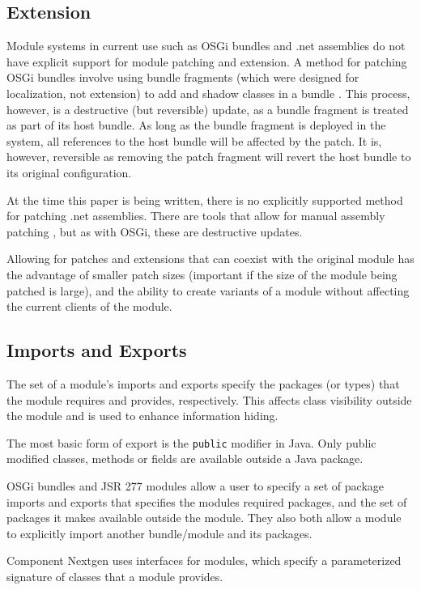 \subsection{Extension}

Module systems in current use such as OSGi bundles and .net assemblies do not 
have explicit support for module patching and extension. A method for patching OSGi bundles
involve using bundle fragments (which were designed for localization, not extension)
to add and shadow classes in a bundle \cite{patchingosgi}. This process, however, is
a destructive (but reversible) update, as a bundle fragment is treated as part of its 
host bundle. As long as the bundle fragment is deployed in the system, all references 
to the host bundle will be affected by the patch. It is, however, reversible as 
removing the patch fragment will revert the host bundle to its original configuration.

At the time this paper is being written, there is no explicitly supported method for
patching .net assemblies. There are tools that allow for manual assembly patching 
\cite{reflexil, monocecil}, but as with OSGi, these are destructive updates.

Allowing for patches and extensions that can coexist with the original module has the
advantage of smaller patch sizes (important if the size of the module being patched is
large), and the ability to create variants of a module without affecting the current
clients of the module.

\subsection{Imports and Exports}

The set of a module's imports and exports specify the packages (or types) that
the module requires and provides, respectively. This affects class
visibility outside the module and is used to enhance information hiding. 

The most basic form of export is the {\tt public} modifier in Java. Only
public modified classes, methods or fields are available outside a Java package.

OSGi bundles and JSR 277 modules allow a user to specify a set of package imports 
and exports that specifies the modules required packages, and the set of packages 
it makes available outside the module. They also both allow a module
to explicitly import another bundle/module and its packages.

Component Nextgen \cite{componentnextgen} uses interfaces for modules, which
specify a parameterized signature of classes that a module provides.

